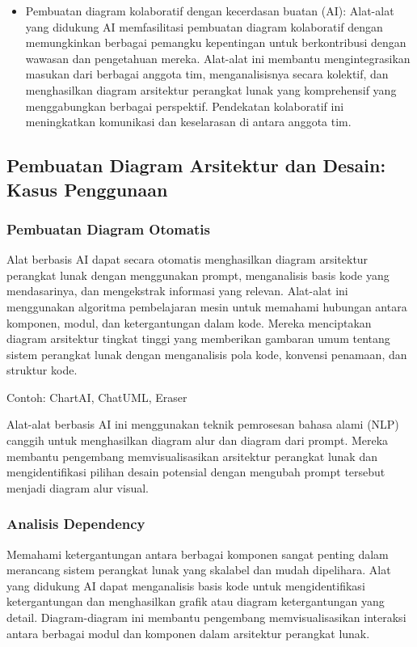\documentclass{article}
\begin{document}
\begin{itemize}
    \item Pembuatan diagram kolaboratif dengan kecerdasan buatan (AI): Alat-alat yang didukung AI memfasilitasi pembuatan diagram kolaboratif dengan memungkinkan berbagai pemangku kepentingan untuk berkontribusi dengan wawasan dan pengetahuan mereka. Alat-alat ini membantu mengintegrasikan masukan dari berbagai anggota tim, menganalisisnya secara kolektif, dan menghasilkan diagram arsitektur perangkat lunak yang komprehensif yang menggabungkan berbagai perspektif. Pendekatan kolaboratif ini meningkatkan komunikasi dan keselarasan di antara anggota tim.
\end{itemize}

\subsection{Pembuatan Diagram Arsitektur dan Desain: Kasus Penggunaan}
\subsubsection{Pembuatan Diagram Otomatis}
Alat berbasis AI dapat secara otomatis menghasilkan diagram arsitektur perangkat lunak dengan menggunakan prompt, menganalisis basis kode yang mendasarinya, dan mengekstrak informasi yang relevan. Alat-alat ini menggunakan algoritma pembelajaran mesin untuk memahami hubungan antara komponen, modul, dan ketergantungan dalam kode. Mereka menciptakan diagram arsitektur tingkat tinggi yang memberikan gambaran umum tentang sistem perangkat lunak dengan menganalisis pola kode, konvensi penamaan, dan struktur kode.

Contoh: ChartAI, ChatUML, Eraser

Alat-alat berbasis AI ini menggunakan teknik pemrosesan bahasa alami (NLP) canggih untuk menghasilkan diagram alur dan diagram dari prompt. Mereka membantu pengembang memvisualisasikan arsitektur perangkat lunak dan mengidentifikasi pilihan desain potensial dengan mengubah prompt tersebut menjadi diagram alur visual.

\subsubsection{Analisis Dependency}
Memahami ketergantungan antara berbagai komponen sangat penting dalam merancang sistem perangkat lunak yang skalabel dan mudah dipelihara. Alat yang didukung AI dapat menganalisis basis kode untuk mengidentifikasi ketergantungan dan menghasilkan grafik atau diagram ketergantungan yang detail. Diagram-diagram ini membantu pengembang memvisualisasikan interaksi antara berbagai modul dan komponen dalam arsitektur perangkat lunak.
\end{document}
